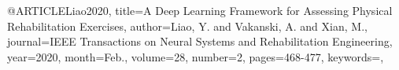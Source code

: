 @ARTICLE{Liao2020,
title={A Deep Learning Framework for Assessing Physical Rehabilitation Exercises},
author={Liao, Y. and Vakanski, A. and Xian, M.},
journal={IEEE Transactions on Neural Systems and Rehabilitation Engineering}, 
year={2020},
month={Feb.},
volume={28},
number={2},
pages={468-477},
keywords={},
}
